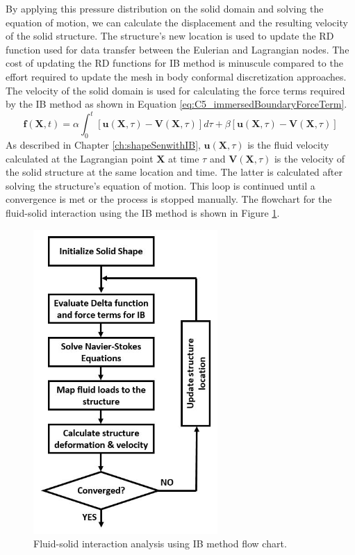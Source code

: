 By applying this pressure distribution on the solid domain and solving the equation of motion, we can calculate the displacement and the resulting velocity of the solid structure. The structure's new location is used to update the RD function used for data transfer between the Eulerian and Lagrangian nodes. The cost of updating the RD functions for IB method is minuscule compared to the effort required to update the mesh in body conformal discretization approaches. The velocity of the solid domain is used for calculating the force terms required by the IB method as shown in Equation \eqref{eq:C5_immersedBoundaryForceTerm}.
%
\begin{equation}\label{eq:C5_immersedBoundaryForceTerm}
    \mathbf{f}(\mathbf{X}, t) = 
    \alpha \int_0^t \left[ \mathbf{u}(\mathbf{X}, \tau) - \mathbf{V}(\mathbf{X}, \tau) \right] d\tau + 
    \beta \left[ \mathbf{u}(\mathbf{X}, \tau) - \mathbf{V}(\mathbf{X}, \tau) \right]
\end{equation}
%
As described in Chapter \ref{ch:shapeSenwithIB}, $\mathbf{u}(\mathbf{X}, \tau)$ is the fluid velocity calculated at the Lagrangian point $\mathbf{X}$ at time $\tau$ and $\mathbf{V}(\mathbf{X}, \tau)$ is the velocity of the solid structure at the same location and time. The latter is calculated after solving the structure's equation of motion. This loop is continued until a convergence is met or the process is stopped manually. The flowchart for the fluid-solid interaction using the IB method is shown in Figure \ref{fig:C5_FSIflowchart}.
%
\begin{figure}[H]
    \centering
    \includegraphics[width=7.00cm]{Chapter_5/figure/Chapter5_FSI_FlowChart.jpg}
    \caption{Fluid-solid interaction analysis using IB method flow chart.}
    \label{fig:C5_FSIflowchart}
\end{figure}
%